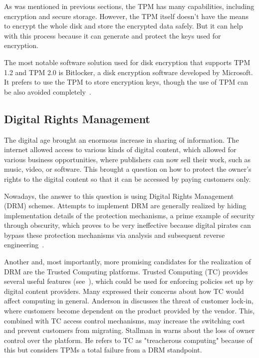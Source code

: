 As was mentioned in previous sections, the TPM has many capabilities, including encryption and secure storage. However, the TPM itself doesn't have the means to encrypt the whole disk and store the encrypted data safely. But it can help with this process because it can generate and protect the keys used for encryption.

The most notable software solution used for disk encryption that supports TPM 1.2 and TPM 2.0 is Bitlocker, a disk encryption software developed by Microsoft. It prefers to use the TPM to store encryption keys, though the use of TPM can be also avoided completely~\cite{bitlockerMDocs}.

\subsection{Digital Rights Management}
The digital age brought an enormous increase in sharing of information. The internet allowed access to various kinds of digital content, which allowed for various business opportunities, where publishers can now sell their work, such as music, video, or software. This brought a question on how to protect the owner's rights to the digital content so that it can be accessed by paying customers only.

Nowadays, the answer to this question is using Digital Rights Management (DRM) schemes. Attempts to implement DRM are generally realized by hiding implementation details of the protection mechanisms, a prime example of security through obscurity, which proves to be very ineffective because digital pirates can bypass these protection mechanisms via analysis and subsequent reverse engineering~\cite{liu2003digital}.

Another and, most importantly, more promising candidates for the realization of DRM are the Trusted Computing platforms. Trusted Computing (TC) provides several useful features (see~), which could be used for enforcing policies set up by digital content providers. Many expressed their concerns about how TC would affect computing in general. Anderson in \cite{anderson2003cryptography} discusses the threat of customer lock-in, where customers become dependent on the product provided by the vendor. This, combined with TC access control mechanisms, may increase the switching cost and prevent customers from migrating. Stallman in \cite{stallman2002treacherous} warns about the loss of owner control over the platform. He refers to TC as "treacherous computing" because of this but considers TPMs a total failure from a DRM standpoint. 


